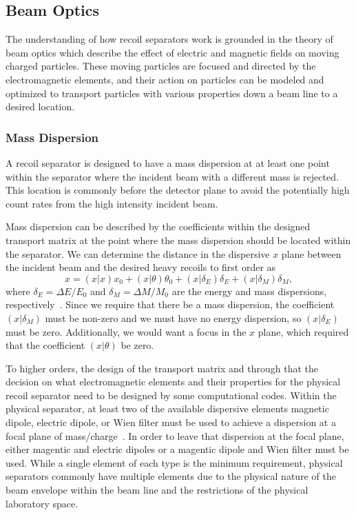 \subsection{Beam Optics}

The understanding of how recoil separators work is grounded in the theory of
beam optics which describe the effect of electric and magnetic fields on moving
charged particles. These moving particles are focused and directed by the
electromagnetic elements, and their action on particles can be modeled and
optimized to transport particles with various properties down a beam line to a
desired location.

\subsubsection{Mass Dispersion}
A recoil separator is designed to have a mass dispersion at at least one point
within the separator where the incident beam with a different mass is rejected.
This location is commonly before the detector plane to avoid the potentially
high count rates from the high intensity incident beam.

Mass dispersion can be described by the coefficients within the designed
transport matrix at the point where the mass dispersion should be located
within the separator. We can determine the distance in the dispersive $x$ plane
between the incident beam and the desired heavy recoils to first order as
\[
    x = (x|x)x_0 + (x|\theta)\theta_0 + (x|\delta_E)\delta_E + (x|\delta_M)\delta_M,
\]
where $\delta_E = \Delta E/E_0$ and $\delta_M = \Delta M/M_0$ are the energy
and mass dispersions, respectively~\cite{Davids2003}. Since we require that
there be a mass dispersion, the coefficient $(x|\delta_M)$ must be non-zero and
we must have no energy dispersion, so $(x|\delta_E)$ must be zero.
Additionally, we would want a focus in the $x$ plane, which required that the
coefficient $(x|\theta)$ be zero.

To higher orders, the design of the transport matrix and through that the
decision on what electromagnetic elements and their properties for the physical
recoil separator need to be designed by some computational codes. Within the
physical separator, at least two of the available dispersive elements magnetic
dipole, electric dipole, or Wien filter must be used to achieve a dispersion at
a focal plane of mass/charge~\cite{Davids2003}. In order to leave that
dispersion at the focal plane, either magentic and electric dipoles or a
magentic dipole and Wien filter must be used. While a single element of each
type is the minimum requirement, physical separators commonly have multiple
elements due to the physical nature of the beam envelope within the beam line
and the restrictions of the physical laboratory space.

